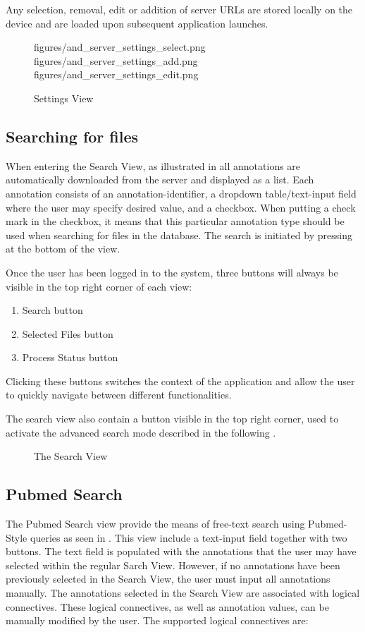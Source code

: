 Any selection, removal, edit or addition of server URLs are stored locally on the device and
are loaded upon subsequent application launches.


\begin{figure}[h]
\addThreeImages
{figures/and_server_settings_select.png}
{figures/and_server_settings_add.png}
{figures/and_server_settings_edit.png}
\caption{Settings View}
\label{fig:and_settings_man}
\end{figure}
\FloatBarrier


\subsection{Searching for files}\label{sec:and_search}

When entering the Search View, as illustrated in  all annotations are automatically
downloaded from the server and displayed as a list. Each annotation consists of an annotation-identifier,
a dropdown table/text-input field where the user may specify desired value, and a checkbox. When putting
a check mark in the checkbox, it means that this particular annotation type should be used when searching
for files in the database. The search is initiated by pressing  at the bottom of the view.

Once the user has been logged in to the system, three buttons will always be visible in the top right corner of each view:
\begin{enumerate}
\item Search button
\item Selected Files button
\item Process Status button
\end{enumerate}

Clicking these buttons switches the context of the application and allow the user to quickly navigate between different functionalities.

The search view also contain a button visible in the top right corner, used to activate the advanced search mode described in the following . 

\begin{figure}[h]
\caption{The Search View}
\label{fig:and_search_man}
\end{figure}
\FloatBarrier


\subsection{Pubmed Search}\label{sec:and_search_pub}
The Pubmed Search view provide the means of free-text search using Pubmed-Style queries as seen in . This view include a text-input field together with two buttons. The text field  is populated with the annotations that the user may have selected within the regular Sarch View. However, if no annotations have been previously selected in the Search View, the user must input all annotations manually. The annotations selected in the Search View are associated with logical connectives. These logical connectives, as well as annotation values, can be manually modified by the user. The supported logical connectives are: 

